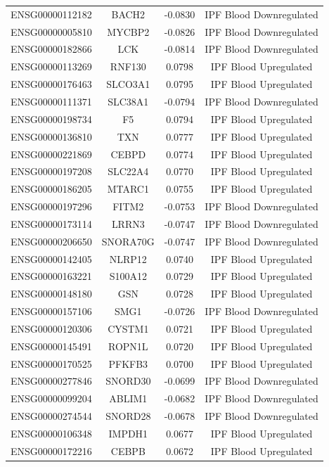 \documentclass[
]{article}
\begin{document}
\begin{singlespace}
\begin{longtable}[t]{lccc}
ENSG00000112182 & BACH2 & -0.0830 & IPF Blood Downregulated\\
ENSG00000005810 & MYCBP2 & -0.0826 & IPF Blood Downregulated\\
\addlinespace
ENSG00000182866 & LCK & -0.0814 & IPF Blood Downregulated\\
ENSG00000113269 & RNF130 & 0.0798 & IPF Blood Upregulated\\
ENSG00000176463 & SLCO3A1 & 0.0795 & IPF Blood Upregulated\\
ENSG00000111371 & SLC38A1 & -0.0794 & IPF Blood Downregulated\\
ENSG00000198734 & F5 & 0.0794 & IPF Blood Upregulated\\
\addlinespace
ENSG00000136810 & TXN & 0.0777 & IPF Blood Upregulated\\
ENSG00000221869 & CEBPD & 0.0774 & IPF Blood Upregulated\\
ENSG00000197208 & SLC22A4 & 0.0770 & IPF Blood Upregulated\\
ENSG00000186205 & MTARC1 & 0.0755 & IPF Blood Upregulated\\
ENSG00000197296 & FITM2 & -0.0753 & IPF Blood Downregulated\\
\addlinespace
ENSG00000173114 & LRRN3 & -0.0747 & IPF Blood Downregulated\\
ENSG00000206650 & SNORA70G & -0.0747 & IPF Blood Downregulated\\
ENSG00000142405 & NLRP12 & 0.0740 & IPF Blood Upregulated\\
ENSG00000163221 & S100A12 & 0.0729 & IPF Blood Upregulated\\
ENSG00000148180 & GSN & 0.0728 & IPF Blood Upregulated\\
\addlinespace
ENSG00000157106 & SMG1 & -0.0726 & IPF Blood Downregulated\\
ENSG00000120306 & CYSTM1 & 0.0721 & IPF Blood Upregulated\\
ENSG00000145491 & ROPN1L & 0.0720 & IPF Blood Upregulated\\
ENSG00000170525 & PFKFB3 & 0.0700 & IPF Blood Upregulated\\
ENSG00000277846 & SNORD30 & -0.0699 & IPF Blood Downregulated\\
\addlinespace
ENSG00000099204 & ABLIM1 & -0.0682 & IPF Blood Downregulated\\
ENSG00000274544 & SNORD28 & -0.0678 & IPF Blood Downregulated\\
ENSG00000106348 & IMPDH1 & 0.0677 & IPF Blood Upregulated\\
ENSG00000172216 & CEBPB & 0.0672 & IPF Blood Upregulated\\

\end{longtable}
\end{singlespace}
\end{document}
